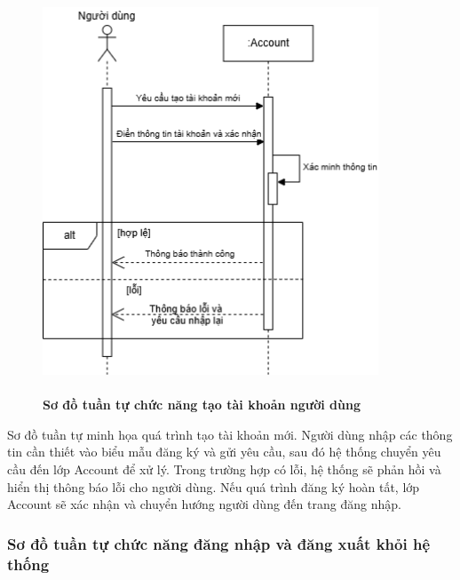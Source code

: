 \begin{figure}[H]
	\centering
	\includegraphics[width=10cm,height=12cm]{Images/sequence/user/register.drawio.png}
	\caption[Sơ đồ tuần tự chức năng tạo tài khoản người dùng]{\bfseries \fontsize{12pt}{0pt}
		\selectfont Sơ đồ tuần tự chức năng tạo tài khoản người dùng}
	\label{sequence_register} %
\end{figure}
Sơ đồ tuần tự minh họa quá trình tạo tài khoản mới. Người dùng nhập các thông tin cần thiết vào biểu mẫu đăng ký và gửi yêu cầu, sau đó hệ thống chuyển yêu cầu đến lớp Account để xử lý.
Trong trường hợp có lỗi, hệ thống sẽ phản hồi và hiển thị thông báo lỗi cho người dùng. Nếu quá trình đăng ký hoàn tất, lớp Account sẽ xác nhận và chuyển hướng người dùng đến trang đăng nhập.

\subsubsection{Sơ đồ tuần tự chức năng đăng nhập và đăng xuất khỏi hệ thống}

